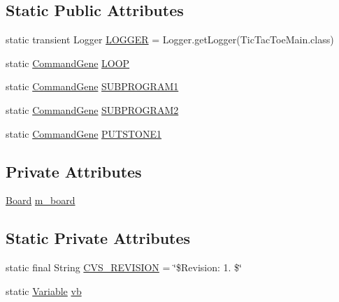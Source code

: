 \subsection*{Static Public Attributes}
\begin{DoxyCompactItemize}
\item 
static transient Logger \hyperlink{classexamples_1_1gp_1_1tictactoe_1_1_tic_tac_toe_main_a6132c3447a4c68cc1f32594dc92d15fc}{L\-O\-G\-G\-E\-R} = Logger.\-get\-Logger(Tic\-Tac\-Toe\-Main.\-class)
\item 
static \hyperlink{classorg_1_1jgap_1_1gp_1_1_command_gene}{Command\-Gene} \hyperlink{classexamples_1_1gp_1_1tictactoe_1_1_tic_tac_toe_main_a05c90d04b5032bed2b3387498fca3a3a}{L\-O\-O\-P}
\item 
static \hyperlink{classorg_1_1jgap_1_1gp_1_1_command_gene}{Command\-Gene} \hyperlink{classexamples_1_1gp_1_1tictactoe_1_1_tic_tac_toe_main_a59354385725397b3705333e608c144f7}{S\-U\-B\-P\-R\-O\-G\-R\-A\-M1}
\item 
static \hyperlink{classorg_1_1jgap_1_1gp_1_1_command_gene}{Command\-Gene} \hyperlink{classexamples_1_1gp_1_1tictactoe_1_1_tic_tac_toe_main_ab9e44b870fe88c9df50fbc4aad0015f9}{S\-U\-B\-P\-R\-O\-G\-R\-A\-M2}
\item 
static \hyperlink{classorg_1_1jgap_1_1gp_1_1_command_gene}{Command\-Gene} \hyperlink{classexamples_1_1gp_1_1tictactoe_1_1_tic_tac_toe_main_ad90866667548bfa5b4f629c9eeeb6578}{P\-U\-T\-S\-T\-O\-N\-E1}
\end{DoxyCompactItemize}
\subsection*{Private Attributes}
\begin{DoxyCompactItemize}
\item 
\hyperlink{classexamples_1_1gp_1_1tictactoe_1_1_board}{Board} \hyperlink{classexamples_1_1gp_1_1tictactoe_1_1_tic_tac_toe_main_adc3305d58fa2343346180dde941852d9}{m\-\_\-board}
\end{DoxyCompactItemize}
\subsection*{Static Private Attributes}
\begin{DoxyCompactItemize}
\item 
static final String \hyperlink{classexamples_1_1gp_1_1tictactoe_1_1_tic_tac_toe_main_abf6d02b9c15c52e94b836062bf20db37}{C\-V\-S\-\_\-\-R\-E\-V\-I\-S\-I\-O\-N} = \char`\"{}\$Revision\-: 1. \$\char`\"{}
\item 
static \hyperlink{classorg_1_1jgap_1_1gp_1_1terminal_1_1_variable}{Variable} \hyperlink{classexamples_1_1gp_1_1tictactoe_1_1_tic_tac_toe_main_aa8bf4d13930cdba013b37193e08e74b2}{vb}
\end{DoxyCompactItemize}
